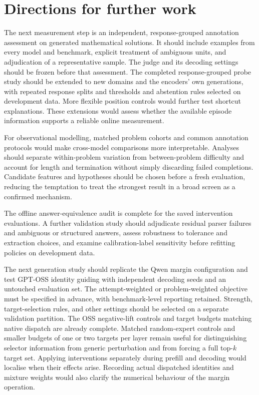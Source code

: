 \documentclass[12pt,a4paper,twoside,openright]{book}
\begin{document}
\section{Directions for further work}

The next measurement step is an independent, response-grouped annotation
assessment on generated mathematical solutions. It should include examples
from every model and benchmark, explicit treatment of ambiguous units, and
adjudication of a representative sample. The judge and its decoding settings
should be frozen before that assessment. The completed response-grouped
probe study should be extended to new domains and the encoders' own
generations, with repeated response splits and thresholds and abstention
rules selected on development data. More flexible position controls would
further test shortcut explanations. These extensions would assess whether
the available episode information supports a reliable online measurement.

For observational modelling, matched problem cohorts and common annotation
protocols would make cross-model comparisons more interpretable. Analyses
should separate within-problem variation from between-problem difficulty
and account for length and termination without simply discarding failed
completions. Candidate features and hypotheses should be chosen before a
fresh evaluation, reducing the temptation to treat the strongest result in
a broad screen as a confirmed mechanism.

The offline answer-equivalence audit is complete for the saved intervention
evaluations. A further validation study should adjudicate residual parser
failures and ambiguous or structured answers, assess robustness to tolerance
and extraction choices, and examine calibration-label sensitivity before
refitting policies on development data.

The next generation study should replicate the Qwen margin configuration
and test GPT-OSS identity guiding with independent decoding seeds
and an untouched evaluation set. The attempt-weighted or problem-weighted
objective must be specified in advance, with benchmark-level reporting
retained. Strength, target-selection rules, and other settings should be
selected on a separate validation partition. The OSS negative-lift
controls and target budgets matching native dispatch are already complete.
Matched random-expert controls and smaller budgets of one or two targets
per layer remain useful for distinguishing selector information from
generic perturbation and from forcing a full top-$k$ target set. Applying interventions separately during
prefill and decoding would localise when their effects arise. Recording
actual dispatched identities and mixture weights would also clarify the
numerical behaviour of the margin operation.
\end{document}
